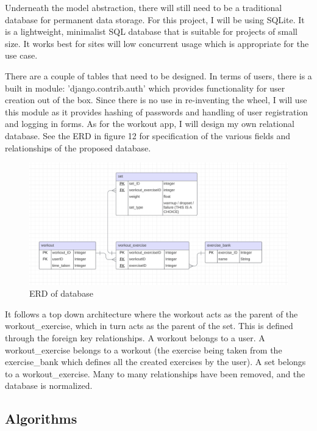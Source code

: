 \documentclass{article}
\begin{document}
Underneath the model abstraction, there will still need to be a traditional database for permanent data storage. For this project, I will be using SQLite. It is a lightweight, minimalist SQL database that is suitable for projects of small size. It works best for sites will low concurrent usage which is appropriate for the use case. 

There are a couple of tables that need to be designed. In terms of users, there is a built in module: 'django.contrib.auth' which provides functionality for user creation out of the box. Since there is no use in re-inventing the wheel, I will use this module as it provides hashing of passwords and handling of user registration and logging in forms. As for the workout app, I will design my own relational database. See the ERD in figure 12 for specification of the various fields and relationships of the proposed database. 

\begin{figure}
  \centering
  \includegraphics[width=1\textwidth]{img/Figure 12.png}
  \caption{ERD of database}
\end{figure}

It follows a top down architecture where the workout acts as the parent of the workout\_exercise, which in turn acts as the parent of the set. This is defined through the foreign key relationships. A workout belongs to a user. A workout\_exercise belongs to a workout (the exercise being taken from the exercise\_bank which defines all the created exercises by the user). A set belongs to a workout\_exercise. Many to many relationships have been removed, and the database is normalized. 

\newpage

\subsection{Algorithms}
\end{document}

